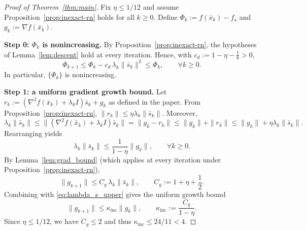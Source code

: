 \documentclass[10pt,twocolumn,letterpaper]{article}
\theoremstyle{compact}
\theoremstyle{compactremark}
\begin{document}
\begin{proof}[Proof of Theorem~\ref{thm:main}]
Fix $\eta\le 1/12$ and assume Proposition~\ref{prop:inexact-rn} holds for all $k\ge 0$.
Define $\Phi_k:=f(\bar x_k)-f_\star$ and $g_k:=\nabla f(\bar x_k)$.

\vspace{1pt}
\noindent\textbf{Step 0: $\Phi_k$ is nonincreasing.}
By Proposition~\ref{prop:inexact-rn}, the hypotheses of Lemma~\ref{lem:descent} hold at every iteration.
Hence, with $c_d:=1-\eta-\frac16>0$,
\begin{equation}\label{eq:Phi_monotone}
\Phi_{k+1}\le \Phi_k - c_d\,\lambda_k\|\bar s_k\|^2\le \Phi_k,
\qquad \forall k\ge 0.
\end{equation}
In particular, $\{\Phi_k\}$ is nonincreasing.

\vspace{1pt}
\noindent\textbf{Step 1: a uniform gradient growth bound.}
Let $r_k:=(\nabla^2 f(\bar x_k)+\lambda_k I)\bar s_k+g_k$ as defined in the paper.
From Proposition~\ref{prop:inexact-rn}, $\|r_k\|\le \eta\lambda_k\|\bar s_k\|$.
Moreover,
\[
\lambda_k\|\bar s_k\|
\le \|(\nabla^2 f(\bar x_k)+\lambda_k I)\bar s_k\|
=\|g_k-r_k\|
\le \|g_k\|+\|r_k\|
\le \|g_k\|+\eta\lambda_k\|\bar s_k\|.
\]
Rearranging yields
\begin{equation}\label{eq:lambda_s_upper}
\lambda_k\|\bar s_k\|\le \frac{1}{1-\eta}\|g_k\|,\qquad \forall k\ge 0.
\end{equation}
By Lemma~\ref{lem:grad_bound} (which applies at every iteration under Proposition~\ref{prop:inexact-rn}),
\[
\|g_{k+1}\|\le C_g\,\lambda_k\|\bar s_k\|,
\qquad
C_g:=1+\eta+\frac12.
\]
Combining with \eqref{eq:lambda_s_upper} gives the uniform growth bound
\begin{equation}\label{eq:grad_growth}
\|g_{k+1}\|\le \kappa_{\mathrm{inc}}\|g_k\|,
\qquad
\kappa_{\mathrm{inc}}:=\frac{C_g}{1-\eta}.
\end{equation}
Since $\eta\le 1/12$, we have $C_g\le 2$ and thus $\kappa_{\mathrm{inc}}\le 24/11<4$.


\end{proof}
\end{document}
